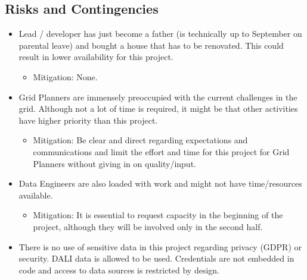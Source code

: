 \documentclass[letterpaper,10pt,english]{sphinxmanual}
\begin{document}
\subsection{Risks and Contingencies}
\label{\detokenize{business_understanding:risks-and-contingencies}}\begin{itemize}
\item {} 
Lead / developer has just become a father (is technically up to September on parental leave) and bought a house that has to be renovated. This could result in lower availability for this project.
\begin{itemize}
\item {} 
Mitigation: None.

\end{itemize}

\item {} 
Grid Planners are immensely preoccupied with the current challenges in the grid. Although not a lot of time is required, it might be that other activities have higher priority than this project.
\begin{itemize}
\item {} 
Mitigation: Be clear and direct regarding expectations and communications and limit the effort and time for this project for Grid Planners without giving in on quality/input.

\end{itemize}

\item {} 
Data Engineers are also loaded with work and might not have time/resources available.
\begin{itemize}
\item {} 
Mitigation: It is essential to request capacity in the beginning of the project, although they will be involved only in the second half.

\end{itemize}

\item {} 
There is no use of sensitive data in this project regarding privacy (GDPR) or security. DALI data is allowed to be used. Credentials are not embedded in code and access to data sources is restricted by design.

\end{itemize}
\end{document}

